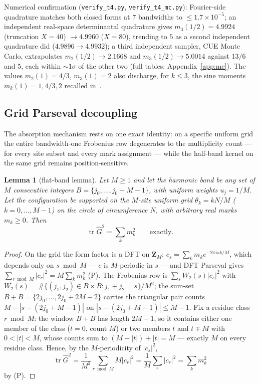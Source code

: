 \documentclass[11pt]{article}
\theoremstyle{plain}
\newtheorem{lemma}[theorem]{Lemma}
\theoremstyle{definition}
\theoremstyle{remark}
\newcommand{\Z}{\mathbf{Z}}
\newcommand{\Gh}{\widehat{G}}
\newcommand{\tr}{\operatorname{tr}}
\begin{document}
Numerical confirmation (\texttt{verify\_t4.py}, \texttt{verify\_t4\_mc.py}):
Fourier-side quadrature matches both closed forms at $7$ bandwidths to
$\le 1.7 \times 10^{-5}$; an independent real-space determinantal quadrature
gives $m_3(1/2) = 4.9924$ (truncation $X = 40$) $\to 4.9960$ ($X = 80$),
trending to $5$ as a second independent quadrature did ($4.9896 \to 4.9932$); a
third independent sampler, CUE Monte Carlo, extrapolates $m_2(1/2) \to 2.1668$
and $m_3(1/2) \to 5.0014$ against $13/6$ and $5$, each within ${\sim}1\sigma$ of
the other two (full tables: Appendix~\ref{app:mc}). The values
$m_2(1) = 4/3$, $m_3(1) = 2$ also discharge, for $k \le 3$, the sine moments
$m_k(1) = 1, 4/3, 2$ recalled in~\cite{AF26}.

\subsection{Grid Parseval decoupling}
\label{sec:decoupling}

The absorption mechanism rests on one exact identity: on a specific uniform grid
the entire bandwidth-one Frobenius row degenerates to the multiplicity count ---
for every site subset and every mark assignment --- while the half-band kernel on
the same grid remains position-sensitive.

\begin{lemma}[flat-band lemma]
\label{lem:flatband}
Let $M \ge 1$ and let the harmonic band be any set of $M$ consecutive integers
$B = \{j_0, \ldots, j_0 + M - 1\}$, with uniform weights $u_j = 1/M$. Let the
configuration be supported on the $M$-site uniform grid $\theta_k = k N/M$
($k = 0, \ldots, M - 1$) on the circle of circumference $N$, with arbitrary real
marks $m_k \ge 0$. Then
\[
  \tr \Gh^2 = \sum_k m_k^2 \qquad \text{exactly.}
\]
\end{lemma}

\begin{proof}
On the grid the form factor is a DFT on $\Z_M$:
$c_s = \sum_k m_k e^{-2\pi i s k/M}$, which depends only on $s \bmod M$ --- $c$
is $M$-periodic in $s$ --- and DFT Parseval gives
$\sum_{r \bmod M} |c_r|^2 = M \sum_k m_k^2$ (P). The Frobenius row is
$\sum_s W_2(s) |c_s|^2$ with
$W_2(s) = \#\{(j_1, j_2) \in B \times B : j_1 + j_2 = s\}/M^2$; the sum-set
$B + B = \{2 j_0, \ldots, 2 j_0 + 2M - 2\}$ carries the triangular pair counts
$M - |s - (2 j_0 + M - 1)|$ on $|s - (2 j_0 + M - 1)| \le M - 1$. Fix a residue
class $r \bmod M$: the window $B + B$ has length $2M - 1$, so it contains either
one member of the class ($t = 0$, count $M$) or two members $t$ and $t \mp M$
with $0 < |t| < M$, whose counts sum to $(M - |t|) + |t| = M$ --- exactly $M$ on
every residue class. Hence, by the $M$-periodicity of $|c_s|^2$,
\[
  \tr \Gh^2 = \frac{1}{M^2} \sum_{r \bmod M} M |c_r|^2
  = \frac{1}{M} \sum_r |c_r|^2 = \sum_k m_k^2
\]
by (P).
\end{proof}
\end{document}
